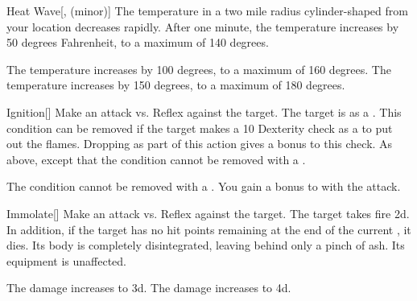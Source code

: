 \lowercase{\hypertarget{spell:Heat Wave}{}}\label{spell:Heat Wave}
\begin{freeability}[Rank 4]{\hypertarget{spell:Heat Wave}{Heat Wave}}[,  (minor)]
\targetrule
The temperature in a two mile radius cylinder-shaped  from your location decreases rapidly.
After one minute, the temperature increases by 50 degrees Fahrenheit, to a maximum of 140 degrees.

\rankline
{} The temperature increases by 100 degrees, to a maximum of 160 degrees.
 The temperature increases by 150 degrees, to a maximum of 180 degrees.
\end{freeability}
\vspace{0.25em}



\lowercase{\hypertarget{spell:Ignition}{}}\label{spell:Ignition}
\begin{freeability}[Rank 4]{\hypertarget{spell:Ignition}{Ignition}}[]
Make an attack vs. Reflex against the target.
\hit The target is  as a .
This condition can be removed if the target makes a  10 Dexterity check as a  to put out the flames.
Dropping  as part of this action gives a  bonus to this check.
\crit As above, except that the condition cannot be removed with a .

\rankline
{} The condition cannot be removed with a .
 You gain a  bonus to  with the attack.
\end{freeability}
\vspace{0.25em}



\lowercase{\hypertarget{spell:Immolate}{}}\label{spell:Immolate}
\begin{freeability}[Rank 4]{\hypertarget{spell:Immolate}{Immolate}}[]
Make an attack vs. Reflex against the target.
\hit The target takes fire  \plus2d.
In addition, if the target has no hit points remaining at the end of the current , it dies.
Its body is completely disintegrated, leaving behind only a pinch of ash.
Its equipment is unaffected.

\rankline
{} The damage increases to  \plus3d.
 The damage increases to  \plus4d.
\end{freeability}
\vspace{0.25em}



